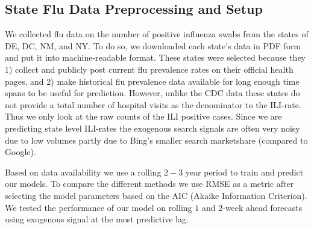 \documentclass[12pt]{article}
\begin{document}
\subsection{State Flu Data Preprocessing and Setup}

We collected flu data on the number of positive influenza swabs from the states of DE, DC, NM, and NY. To do so, we downloaded each state's data in PDF form and put it into machine-readable format. These states were selected because they 1) collect and publicly post current flu prevalence rates on their official health pages, and 2) make historical flu prevalence data available for long enough time spans to be useful for prediction. However, unlike the CDC data these states do not provide a total number of hospital visits as the denominator to the ILI-rate. Thus we only look at the raw counts of the ILI positive cases. Since we are predicting state level ILI-rates the exogenous search signals are often very noisy due to low volumes partly due to Bing's smaller search marketshare (compared to Google). 

Based on data availability we use a rolling $2-3$ year period to train and predict our models. To compare the different methods we use RMSE as a metric after selecting the model parameters based on the AIC (Akaike Information Criterion). We tested the performance of our model on rolling $1$ and $2$-week ahead forecasts using exogenous signal at the most predictive lag.



\end{document}
